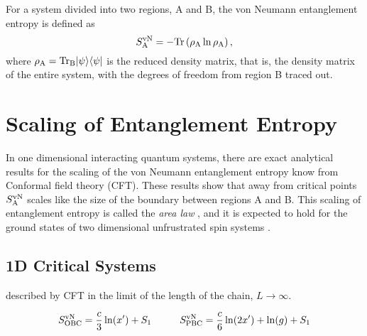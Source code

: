 For a system divided into two regions, A and B, the von Neumann entanglement entropy is defined as
\begin{equation}
	S^{\text{vN}}_\text{A} = -\rm{Tr}\left({\rho_A \ln \rho_A}\right),
\end{equation}
where $\rho_{\rm{A}}=\rm{Tr}_B\lvert {\psi} \rangle\langle {\psi} \rvert$ is the reduced density matrix, that is, the density matrix of the entire system, with the degrees of freedom from region B traced out.
\section{Scaling of Entanglement Entropy}
In one dimensional interacting quantum systems, there are exact analytical results for the scaling of the von Neumann entanglement entropy know from Conformal field theory (CFT).
These results show that away from critical points $S^{\text{vN}}_\text{A}$ scales like the size of the boundary between regions A and B.  This scaling of entanglement entropy is called the {\it area law} \cite{Shredder}, and it is expected to hold for the ground states of two dimensional unfrustrated spin systems \cite{DeBeaudrap2010} .




\subsection{1D Critical Systems}
\label{1dcft}

\cite{Cardy} \cite{Zhou2006}

described by CFT in the limit of the length of the chain, $L \rightarrow \infty$.

\begin{equation} \label{cft1d}
	S^{\text{vN}}_{\text{OBC}} = \frac{c}{3}\ln(x') + S_1
	\hspace{1cm}
	S^{\text{vN}}_{\text{PBC}} = \frac{c}{6}\ln(2x') + \ln(g)+ S_1
\end{equation}





